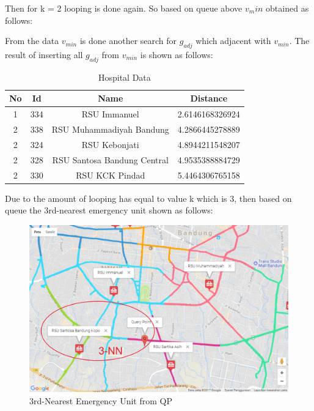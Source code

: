 Then for k = 2 looping is done again. So based on queue above $v_min$ obtained as follows:

\begin{table}[H]
\end{table}

From the data $v_ {min}$ is done another search for $g_ {adj}$ which adjacent with $v_ {min}$. The result of inserting all $g_ {adj}$ from $v_ {min}$ is shown as follows:

\begin{table}[H] 
\centering
\begin{tabular}{|c|c|c|c|}
\hline
\textbf{No} & \textbf{Id} & \textbf{Name} & \textbf{Distance} \\
\hline
1 &  334 & RSU Immanuel & 2.6146168326924\\
\hline
2 &  338 & RSU Muhammadiyah Bandung & 4.2866445278889\\
\hline
2 &  324 & RSU Kebonjati & 4.8944211548207\\
\hline
2 &  328 & RSU Santosa Bandung Central & 4.9535388884729\\
\hline
2 &  330 & RSU KCK Pindad & 5.4464306765158\\
\hline
\end{tabular}
\caption{Hospital Data}
\label{table:tblhospital}
\end{table}

Due to the amount of looping has equal to value k which is 3, then based on queue the 3rd-nearest emergency unit shown as follows:

\begin{figure}[H]
    \centering
    \includegraphics[scale=0.55]{data_proc_nvd-based_knn_3.png}
    \caption{3rd-Nearest Emergency Unit from QP}
    \label{fig:emergency_location_coordinate}
\end{figure}

